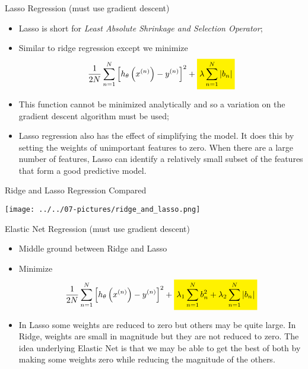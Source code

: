 \documentclass[11pt]{beamer}
\newcommand{\highlight}[1]{%
  \colorbox{yellow!100}{$\displaystyle#1$}}
\begin{document}
\begin{frame}{Lasso Regression (must use gradient descent)}
	\begin{itemize}
	\item Lasso is short for \textit{Least Absolute Shrinkage and Selection Operator};
		\item Similar to ridge regression except we minimize
		\begin{equation}
		\frac{1}{2N} \sum\limits_{n=1}^N \left[h_\theta \left( x^{(n)} \right) - y ^{(n)}\right]^2 + \highlight{\lambda \sum\limits_{n=1}^N \vert b_n \vert}
		\end{equation}
		\item This function cannot be minimized analytically and so a variation on the gradient descent algorithm must be used;
		\item Lasso regression also has the effect of simplifying the model. It does this by setting the weights of unimportant features to zero. When there are a large number of features, Lasso can identify a relatively small subset of the features that form a good predictive model.
	\end{itemize}
\end{frame}
\begin{frame}{Ridge and Lasso Regression Compared}
\begin{center}
\texttt{[image: ../../07-pictures/ridge\_and\_lasso.png]} 
\end{center}
\end{frame}
\begin{frame}{Elastic Net Regression (must use gradient descent)}
	\begin{itemize}
		\item Middle ground between Ridge and Lasso
		\item Minimize
		\begin{equation}
		\frac{1}{2N} \sum\limits_{n=1}^N \left[h_\theta \left( x^{(n)} \right) - y ^{(n)}\right]^2 + \highlight{\lambda_1 \sum\limits_{n=1}^N b_n^2 + \lambda_2 \sum\limits_{n=1}^N \vert b_n \vert}
		\end{equation}
		\item In Lasso some weights are reduced to zero but others may be quite large. In Ridge, weights are small in magnitude but they are not reduced to zero. The idea underlying Elastic Net is that we may be able to get the best of both by making some weights zero while reducing the magnitude of the others.
	\end{itemize}
\end{frame}
\end{document}
